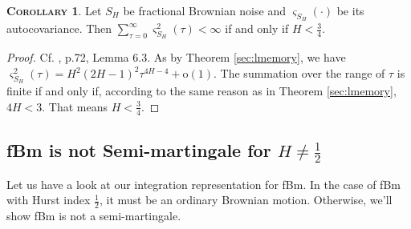 \documentclass[a4paper, twoside, 11pt]{article}
\theoremstyle{definition}
\newtheorem{corollary}[definition]{\scshape Corollary}
\begin{document}
  \begin{corollary}
	Let $S_H$ be fractional Brownian noise and $\varsigma_{S_H}(\cdot)$ be its autocovariance. Then $\sum_{\tau=0}^{\infty}\varsigma^2_{S_H}(\tau)<\infty$ if and only if $H < \frac{3}{4}$.
  \end{corollary}
  \begin{proof}
	  Cf. \cite{nourdin}, p.72, Lemma 6.3. As by Theorem \ref{sec:lmemory}, we have $\varsigma_{S_H}^2(\tau) = H^2(2H-1)^2\tau^{4H-4} + \mathrm{o}(1) $. The summation over the range of $\tau$ is finite if and only if, according to the same reason as in Theorem \ref{sec:lmemory}, $4H<3$. That means $H < \frac{3}{4}$.
  \end{proof}
  \subsection{fBm is not Semi-martingale for $H\neq \frac{1}{2}$}
  Let us have a look at our integration representation for fBm. In the case of fBm with Hurst index $\frac{1}{2}$, it must be an ordinary Brownian motion. Otherwise, we'll show fBm is not a semi-martingale.
\end{document}
